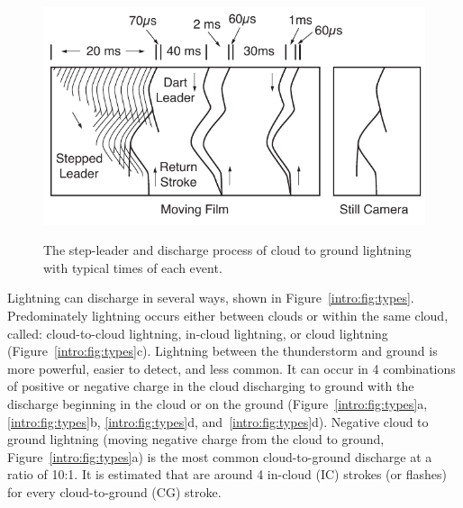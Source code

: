 \begin{figure}[ht!]
	\centering
	\includegraphics[scale=1]{Introduction/Figures/Lightning_Evolution.pdf}\\
	\caption{The step-leader and discharge process of cloud to ground lightning with typical times of each event.}
	\label{intro:fig:evolution}
\end{figure}

Lightning can discharge in several ways, shown in Figure~\ref{intro:fig:types}.
Predominately lightning occurs either between clouds or within the same cloud, called: cloud-to-cloud lightning, in-cloud lightning, or cloud lightning (Figure~\ref{intro:fig:types}c).
Lightning between the thunderstorm and ground is more powerful, easier to detect, and less common.
It can occur in 4 combinations of positive or negative charge in the cloud discharging to ground with the discharge beginning in the cloud or on the ground (Figure~\ref{intro:fig:types}a, \ref{intro:fig:types}b, \ref{intro:fig:types}d, and~\ref{intro:fig:types}d).
Negative cloud to ground lightning (moving negative charge from the cloud to ground, Figure~\ref{intro:fig:types}a) is the most common cloud-to-ground discharge at a ratio of 10:1.
It is estimated that are around 4 in-cloud (IC) strokes (or flashes) for every cloud-to-ground (CG) stroke.

